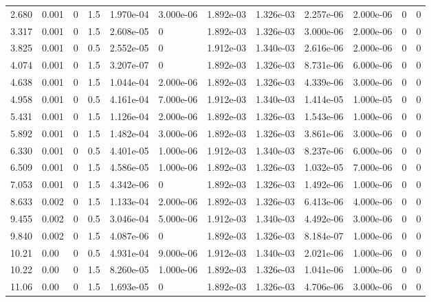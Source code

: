 \documentclass[preview]{standalone}
\begin{document}
{{\begin{tabular}{L{1.2cm}C{1.2cm} C{0.3cm}C{0.5cm} C{1.4cm}C{1.4cm} C{1.4cm}C{1.4cm} C{1.6cm}C{1.6cm} C{1.6cm}C{1.6cm}}
  2.680  &  0.001  & 0     & 1.5 &  1.970e-04  & 3.000e-06  &  1.892e-03&   1.326e-03& 2.257e-06 & 2.000e-06   &  0 & 0  \\ 
  3.317  &  0.001  & 0     & 1.5 &  2.608e-05  & 0  &  1.892e-03&   1.326e-03& 3.000e-06 & 2.000e-06   &  0 & 0  \\ 
  3.825  &  0.001  & 0     & 0.5 &  2.552e-05  & 0  &  1.912e-03&   1.340e-03& 2.616e-06 & 2.000e-06   &  0 & 0  \\ 
  4.074  &  0.001  & 0     & 1.5 &  3.207e-07  & 0  &  1.892e-03&   1.326e-03& 8.731e-06 & 6.000e-06   &  0 & 0  \\ 
  4.638  &  0.001  & 0     & 1.5 &  1.044e-04  & 2.000e-06  &  1.892e-03&   1.326e-03& 4.339e-06 & 3.000e-06   &  0 & 0  \\ 
  4.958  &  0.001  & 0     & 0.5 &  4.161e-04  & 7.000e-06  &  1.912e-03&   1.340e-03& 1.414e-05 & 1.000e-05   &  0 & 0  \\ 
  5.431  &  0.001  & 0     & 1.5 &  1.126e-04  & 2.000e-06  &  1.892e-03&   1.326e-03& 1.543e-06 & 1.000e-06   &  0 & 0  \\ 
  5.892  &  0.001  & 0     & 1.5 &  1.482e-04  & 3.000e-06  &  1.892e-03&   1.326e-03& 3.861e-06 & 3.000e-06   &  0 & 0  \\ 
  6.330  &  0.001  & 0     & 0.5 &  4.401e-05  & 1.000e-06  &  1.912e-03&   1.340e-03& 8.237e-06 & 6.000e-06   &  0 & 0  \\ 
  6.509  &  0.001  & 0     & 1.5 &  4.586e-05  & 1.000e-06  &  1.892e-03&   1.326e-03& 1.032e-05 & 7.000e-06   &  0 & 0  \\ 
  7.053  &  0.001  & 0     & 1.5 &  4.342e-06  & 0  &  1.892e-03&   1.326e-03& 1.492e-06 & 1.000e-06   &  0 & 0  \\ 
  8.633  &  0.002  & 0     & 1.5 &  1.133e-04  & 2.000e-06  &  1.892e-03&   1.326e-03& 6.413e-06 & 4.000e-06   &  0 & 0  \\ 
  9.455  &  0.002  & 0     & 0.5 &  3.046e-04  & 5.000e-06  &  1.912e-03&   1.340e-03& 4.492e-06 & 3.000e-06   &  0 & 0  \\ 
  9.840  &  0.002  & 0     & 1.5 &  4.087e-06  & 0  &  1.892e-03&   1.326e-03& 8.184e-07 & 1.000e-06   &  0 & 0  \\ 
  10.21  &  0.00  & 0     & 0.5 &  4.931e-04  & 9.000e-06  &  1.912e-03&   1.340e-03& 2.021e-06 & 1.000e-06   &  0 & 0  \\ 
  10.22  &  0.00  & 0     & 1.5 &  8.260e-05  & 1.000e-06  &  1.892e-03&   1.326e-03& 1.041e-06 & 1.000e-06   &  0 & 0  \\ 
  11.06  &  0.00  & 0     & 1.5 &  1.693e-05  & 0  &  1.892e-03&   1.326e-03& 4.706e-06 & 3.000e-06   &  0 & 0  \\ 

\end{tabular}}}
\end{document}
